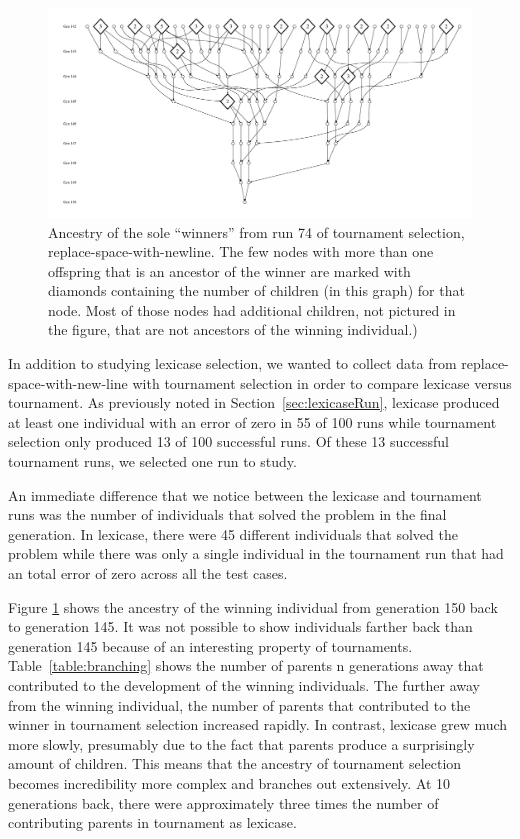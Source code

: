 \begin{figure}
	\vspace{0.6\columnwidth}
	\includegraphics[width=\columnwidth]{figures/ancestors_of_winner_rswn_tourney_run74_9gens.pdf}
	\caption{Ancestry of the sole ``winners'' from run 74 of tournament selection, 
		replace-space-with-newline. The few nodes with more than one offspring that is an ancestor of the winner
		are marked with diamonds containing the number of children (in this graph) for that node. Most of those
		nodes had additional children, not pictured in the figure, that are not ancestors of the winning individual.)}
	\label{fig:winnerAncestorsTourneyRun74}
\end{figure}

In addition to studying lexicase selection, we wanted to collect data from replace-space-with-new-line 
with tournament selection in order to compare lexicase versus tournament. As previously noted in 
Section~\ref{sec:lexicaseRun}, lexicase  produced at least one individual with an error of zero in 
55 of 100 runs while tournament selection only produced 13 of 100 successful runs. Of these 13 
successful tournament runs, we selected one run to study.

An immediate difference that we notice between the lexicase and tournament runs was the number of 
individuals that solved the problem in the final generation. In lexicase, there were 45 different 
individuals that solved the problem while there was only a single individual in the tournament 
run that had an total error of zero across all the test cases.

Figure \ref{fig:winnerAncestorsTourneyRun74} shows the ancestry of the winning individual from 
generation 150 back to generation 145. It was not possible to show individuals farther back than 
generation 145 because of an interesting property of tournaments. Table~\ref{table:branching} shows 
the number of parents n generations away that contributed to the development of the winning individuals. 
The further away from the winning individual, the number of parents that contributed to the winner 
in tournament selection increased rapidly. In contrast, lexicase grew much more slowly, presumably 
due to the fact that parents produce a surprisingly amount of children. This means that the ancestry 
of tournament selection becomes incredibility more complex and branches out extensively. At 10 
generations back, there were approximately three times the number of contributing parents in 
tournament as lexicase. 

